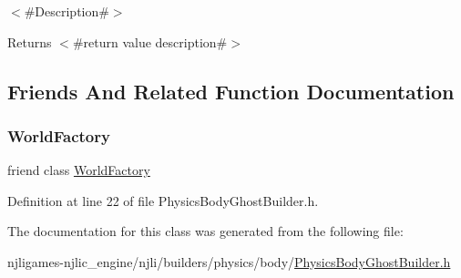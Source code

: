 $<$\#\+Description\#$>$

\begin{DoxyReturn}{Returns}
$<$\#return value description\#$>$ 
\end{DoxyReturn}


\subsection{Friends And Related Function Documentation}
\mbox{\label{classnjli_1_1_physics_body_ghost_builder_acb96ebb09abe8f2a37a915a842babfac}} 
\subsubsection{\texorpdfstring{World\+Factory}{WorldFactory}}
{\footnotesize\ttfamily friend class \mbox{\hyperlink{classnjli_1_1_world_factory}{World\+Factory}}\hspace{0.3cm}{\ttfamily [friend]}}



Definition at line 22 of file Physics\+Body\+Ghost\+Builder.\+h.



The documentation for this class was generated from the following file\+:\begin{DoxyCompactItemize}
\item 
njligames-\/njlic\+\_\+engine/njli/builders/physics/body/\mbox{\hyperlink{_physics_body_ghost_builder_8h}{Physics\+Body\+Ghost\+Builder.\+h}}\end{DoxyCompactItemize}
